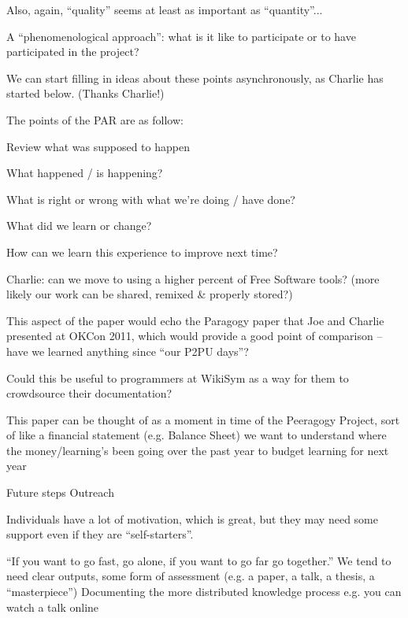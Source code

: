 \documentclass{acm_proc_article-sp}
\begin{document}
        Also, again, ``quality'' seems at least as important as ``quantity''... 

    A ``phenomenological approach'': what is it like to participate or to have participated in the project?


            We can start filling in ideas about these points asynchronously, as Charlie has started below. (Thanks Charlie!)

        The points of the PAR are as follow:

            Review what was supposed to happen

            What happened / is happening?

            What is right or wrong with what we're doing / have done?

            What did we learn or change?

            How can we learn this experience to improve next time?

                Charlie: can we move to using a higher percent of Free Software tools? (more likely our work can be shared, remixed \& properly stored?)

        This aspect of the paper would echo the Paragogy paper that Joe and Charlie presented at OKCon 2011, which would provide a good point of comparison -- have we learned anything since ``our P2PU days''?

Could this be useful to programmers at WikiSym as a way for them to crowdsource their documentation?

This paper can be thought of as a moment in time of the Peeragogy Project, sort of like a financial statement (e.g. Balance Sheet) we want to understand where the money/learning's been going over the past year to budget learning for next year

Future steps
Outreach

Individuals have a lot of motivation, which is great, but they may need some support even if they are ``self-starters''.

``If you want to go fast, go alone, if you want to go far go together.''
We tend to need clear outputs, some form of assessment (e.g. a paper,
a talk, a thesis, a ``masterpiece'')
Documenting the more distributed knowledge process
e.g. you can watch a talk online

%
\end{document}
